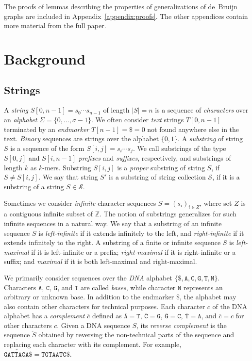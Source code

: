 \documentclass[a4paper,UKenglish]{lipics-v2016}
\newcommand{\set}[1]{\ensuremath{\{ #1 \}}}
\newcommand{\abs}[1]{\ensuremath{\lvert #1 \rvert}}
\newcommand{\dnaseq}[1]{\ensuremath{\mathtt{#1}}}
\newcommand{\baseA}{\dnaseq{A}}
\newcommand{\baseC}{\dnaseq{C}}
\newcommand{\baseG}{\dnaseq{G}}
\newcommand{\baseT}{\dnaseq{T}}
\newcommand{\baseN}{\dnaseq{N}}
\newcommand{\dnacomp}[1]{\ensuremath{\overline{#1}}}
\newcommand{\revcomp}[1]{\ensuremath{\overleftarrow{#1}}}
\newcommand{\kmer}[1]{$#1$\nobreakdash-mer}
\begin{document}
The proofs of lemmas describing the properties of generalizations of de~Bruijn graphs are included in Appendix~\ref{appendix:proofs}. The other appendices contain more material from the full paper.


\section{Background}

\subsection{Strings}\label{sect:strings}

A \emph{string} $S[0, n-1] = s_{0} \dotsm s_{n-1}$ of length $\abs{S} = n$ is a sequence of \emph{characters} over an \emph{alphabet} $\Sigma = \set{0, \dotsc, \sigma - 1}$. We often consider \emph{text} strings $T[0, n-1]$ terminated by an \emph{endmarker} $T[n-1] = \$ = 0$ not found anywhere else in the text. \emph{Binary} sequences are strings over the alphabet $\set{0, 1}$. A \emph{substring} of string $S$ is a sequence of the form $S[i, j] = s_{i} \dotsm s_{j}$. We call substrings of the type $S[0, j]$ and $S[i, n-1]$ \emph{prefixes} and \emph{suffixes}, respectively, and substrings of length $k$ as \kmer{k}s. Substring $S[i, j]$ is a \emph{proper} substring of string $S$, if $S \ne S[i, j]$. We say that string $S'$ is a substring of string collection $\mathcal{S}$, if it is a substring of a string $S \in \mathcal{S}$.

Sometimes we consider \emph{infinite} character sequences $S = (s_{i})_{i \in Z}$, where set $Z$ is a contiguous infinite subset of $\mathbb{Z}$. The notion of substrings generalizes for such infinite sequences in a natural way. We say that a substring of an infinite sequence $S$ is \emph{left-infinite} if it extends infinitely to the left, and \emph{right-infinite} if it extends infinitely to the right. A substring of a finite or infinite sequence $S$ is \emph{left-maximal} if it is left-infinite or a prefix; \emph{right-maximal} if it is right-infinite or a suffix; and \emph{maximal} if it is both left-maximal and right-maximal.

We primarily consider sequences over the \emph{DNA} alphabet $\set{\$, \baseA, \baseC, \baseG, \baseT, \baseN}$. Characters $\baseA$, $\baseC$, $\baseG$, and $\baseT$ are called \emph{bases}, while character $\baseN$ represents an arbitrary or unknown base. In addition to the endmarker $\$$, the alphabet may also contain other characters for technical purposes. Each character $c$ of the DNA alphabet has a \emph{complement} $\dnacomp{c}$ defined as $\dnacomp{\baseA} = \baseT$, $\dnacomp{\baseC} = \baseG$, $\dnacomp{\baseG} = \baseC$, $\dnacomp{\baseT} = \baseA$, and $\dnacomp{c} = c$ for other characters $c$. Given a DNA sequence $S$, its \emph{reverse complement} is the sequence $\revcomp{S}$ obtained by reversing the non-technical parts of the sequence and replacing each character with its complement. For example, $\revcomp{\dnaseq{GATTACA}\$} = \dnaseq{TGTAATC}\$$.
\end{document}
